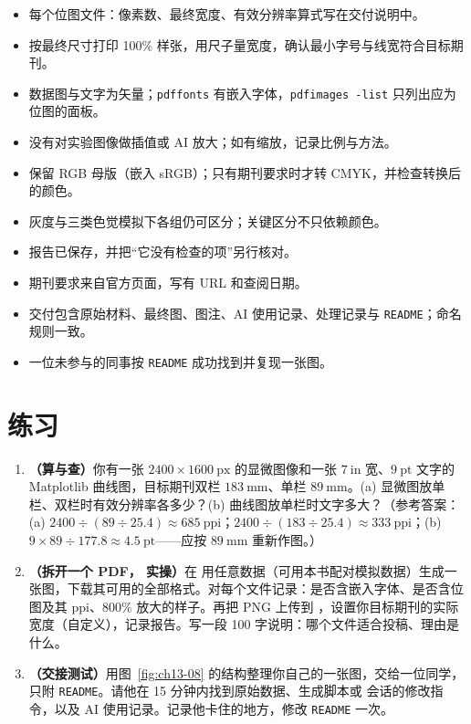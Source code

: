 \begin{itemize}
\item 每个位图文件：像素数、最终宽度、有效分辨率算式写在交付说明中。
\item 按最终尺寸打印 100\% 样张，用尺子量宽度，确认最小字号与线宽符合目标期刊。
\item 数据图与文字为矢量；\texttt{pdffonts} 有嵌入字体，\texttt{pdfimages -list} 只列出应为位图的面板。
\item 没有对实验图像做插值或 AI 放大；如有缩放，记录比例与方法。
\item 保留 RGB 母版（嵌入 sRGB）；只有期刊要求时才转 CMYK，并检查转换后的颜色。
\item 灰度与三类色觉模拟下各组仍可区分；关键区分不只依赖颜色。
\item {} 报告已保存，并把“它没有检查的项”另行核对。
\item 期刊要求来自官方页面，写有 URL 和查阅日期。
\item 交付包含原始材料、最终图、图注、AI 使用记录、处理记录与 \texttt{README}；命名规则一致。
\item 一位未参与的同事按 \texttt{README} 成功找到并复现一张图。
\end{itemize}

\section{练习}

\begin{enumerate}
\item \textbf{（算与查）}你有一张 $2400 \times 1600\ \text{px}$ 的显微图像和一张 $7\ \text{in}$ 宽、$9\ \text{pt}$ 文字的 Matplotlib 曲线图，目标期刊双栏 $183\ \text{mm}$、单栏 $89\ \text{mm}$。(a) 显微图放单栏、双栏时有效分辨率各多少？(b) 曲线图放单栏时文字多大？（参考答案：(a) $2400 \div (89 \div 25.4) \approx 685\ \text{ppi}$；$2400 \div (183 \div 25.4) \approx 333\ \text{ppi}$；(b) $9 \times 89 \div 177.8 \approx 4.5\ \text{pt}$——应按 $89\ \text{mm}$ 重新作图。）
\item \textbf{（拆开一个 PDF，\scidraw{} 实操）}在  用任意数据（可用本书配对模拟数据）生成一张图，下载其可用的全部格式。对每个文件记录：是否含嵌入字体、是否含位图及其 ppi、$800\%$ 放大的样子。再把 PNG 上传到 ，设置你目标期刊的实际宽度（自定义），记录报告。写一段 100 字说明：哪个文件适合投稿、理由是什么。
\item \textbf{（交接测试）}用图~\ref{fig:ch13-08} 的结构整理你自己的一张图，交给一位同学，只附 \texttt{README}。请他在 15 分钟内找到原始数据、生成脚本或 \scidraw{} 会话的修改指令，以及 AI 使用记录。记录他卡住的地方，修改 \texttt{README} 一次。
\end{enumerate}

